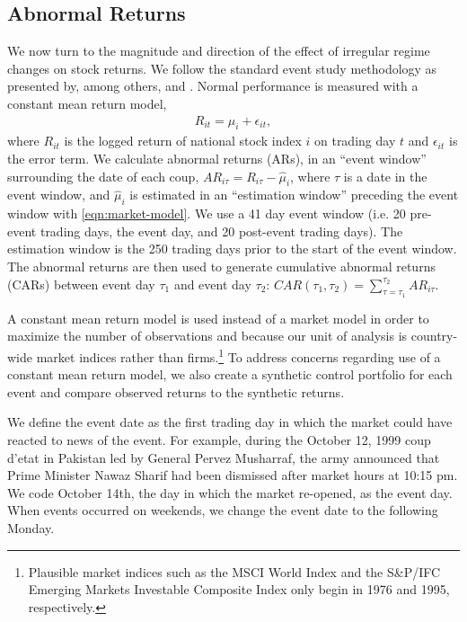 \documentclass[12pt,final,fleqn]{article}
\theoremstyle{plain}
\begin{document}
\subsection{Abnormal Returns} \label{subsec:abnormal-returns}

We now turn to the magnitude and direction of the effect of irregular regime changes on stock returns. We follow the standard event study methodology as presented by, among others, \citet{mackinlay1997event} and \citet{campbell1997econometrics}. Normal performance is measured with a constant mean return model,
\begin{align} \label{eqn:market-model}
R_{it}=\mu_{i}+\epsilon_{it},
\end{align}
where $R_{it}$ is the logged return of national stock index $i$ on trading day $t$ and $\epsilon_{it}$ is the error term. We calculate abnormal returns (ARs), in an ``event window'' surrounding the date of each coup, $AR_{i\tau}=R_{i\tau}-\widehat{\mu}_i$, where $\tau$ is a date in the event window, and $\widehat{\mu}_i$ is estimated in an ``estimation window'' preceding the event window with \autoref{eqn:market-model}. We use a 41 day event window (i.e. 20 pre-event trading days, the event day, and 20 post-event trading days). The estimation window is the 250 trading days prior to the start of the event window. The abnormal returns are then used to generate cumulative abnormal returns (CARs) between event day $\tau_1$ and event day $\tau_2$: $CAR(\tau_1,\tau_2)=\sum_{\tau=\tau_1}^{\tau_2}AR_{i\tau}$.

A constant mean return model is used instead of a market model in order to maximize the number of observations and because our unit of analysis is country-wide market indices rather than firms.\footnote{Plausible market indices such as the MSCI World Index and the S\&P/IFC Emerging Markets Investable Composite Index only begin in 1976 and 1995, respectively.} To address concerns regarding use of a constant mean return model, we also create a synthetic control portfolio for each event and compare observed returns to the synthetic returns. 

We define the event date as the first trading day in which the market could have reacted to news of the event. For example, during the October 12, 1999 coup d'etat in Pakistan led by General Pervez Musharraf, the army announced that Prime Minister Nawaz Sharif had been dismissed after market hours at 10:15 pm. We code October 14th, the day in which the market re-opened, as the event day. When events occurred on weekends, we change the event date to the following Monday.
\end{document}
